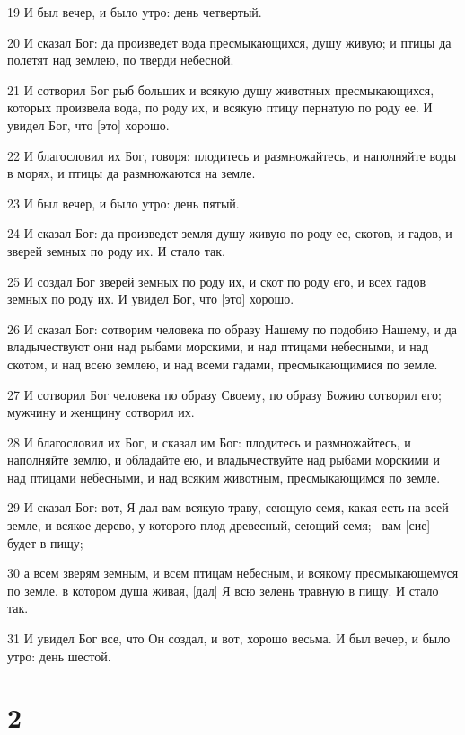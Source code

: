 \par 19 И был вечер, и было утро: день четвертый.
\par 20 И сказал Бог: да произведет вода пресмыкающихся, душу живую; и птицы да полетят над землею, по тверди небесной.
\par 21 И сотворил Бог рыб больших и всякую душу животных пресмыкающихся, которых произвела вода, по роду их, и всякую птицу пернатую по роду ее. И увидел Бог, что [это] хорошо.
\par 22 И благословил их Бог, говоря: плодитесь и размножайтесь, и наполняйте воды в морях, и птицы да размножаются на земле.
\par 23 И был вечер, и было утро: день пятый.
\par 24 И сказал Бог: да произведет земля душу живую по роду ее, скотов, и гадов, и зверей земных по роду их. И стало так.
\par 25 И создал Бог зверей земных по роду их, и скот по роду его, и всех гадов земных по роду их. И увидел Бог, что [это] хорошо.
\par 26 И сказал Бог: сотворим человека по образу Нашему по подобию Нашему, и да владычествуют они над рыбами морскими, и над птицами небесными, и над скотом, и над всею землею, и над всеми гадами, пресмыкающимися по земле.
\par 27 И сотворил Бог человека по образу Своему, по образу Божию сотворил его; мужчину и женщину сотворил их.
\par 28 И благословил их Бог, и сказал им Бог: плодитесь и размножайтесь, и наполняйте землю, и обладайте ею, и владычествуйте над рыбами морскими и над птицами небесными, и над всяким животным, пресмыкающимся по земле.
\par 29 И сказал Бог: вот, Я дал вам всякую траву, сеющую семя, какая есть на всей земле, и всякое дерево, у которого плод древесный, сеющий семя; --вам [сие] будет в пищу;
\par 30 а всем зверям земным, и всем птицам небесным, и всякому пресмыкающемуся по земле, в котором душа живая, [дал] Я всю зелень травную в пищу. И стало так.
\par 31 И увидел Бог все, что Он создал, и вот, хорошо весьма. И был вечер, и было утро: день шестой.

\chapter{2}

